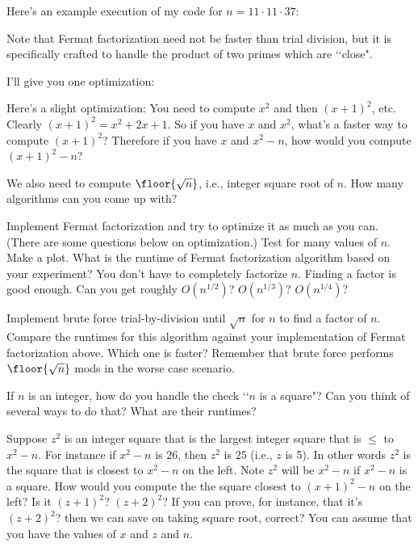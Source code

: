 Here's an example execution of my code
for $n = 11 \cdot 11 \cdot 37$:

Note that Fermat factorization need not be faster than trial division,
but it is specifically crafted to handle the product of two primes which are
\lq\lq close".

I'll give you one optimization:

\begin{ex}
Here's a slight optimization:
You need to compute $x^2$ and then $(x + 1)^2$, etc.
Clearly $(x + 1)^2 = x^2 + 2x + 1$.
So if you have $x$ and $x^2$, what's a faster way to compute $(x + 1)^2$?
Therefore if you have $x$ and $x^2 - n$, how would you compute
$(x+1)^2 - n$?
\end{ex}

\begin{ex}
  We also need to compute $\floor{\sqrt{n}}$, i.e., integer square root
  of $n$.
  How many algorithms can you come up with?
\end{ex}

\begin{ex}
  Implement Fermat factorization and try to optimize it as much as you can.
  (There are some questions below on optimization.)
  Test for many values of $n$.
  Make a plot.
  What is the runtime of Fermat factorization algorithm based on your experiment?
  You don't have to completely factorize $n$.
  Finding a factor is good enough.
  Can you get roughly $O(n^{1/2})$? $O(n^{1/3})$? $O(n^{1/4})$?
\end{ex}

\begin{ex}
  Implement brute force trial-by-division until $\sqrt{n}$ for $n$
  to find a factor of $n$.
  Compare the runtimes for this algorithm
  against your implementation of Fermat factorization above.
  Which one is faster?
  Remember that brute force performs $\floor{\sqrt{n}}$ mods in the worse case scenario.
\end{ex}

\begin{ex}
  If $n$ is an integer, how do you handle the check \lq\lq $n$ is a square"?
  Can you think of several ways to do that?
  What are their runtimes?
\end{ex}


\begin{ex}
  Suppose $z^2$ is an integer square that is the largest integer square that is $\leq$ to $x^2 - n$.
  For instance if $x^2 - n$ is $26$, then $z^2$ is $25$ (i.e., $z$ is 5).
  In other words $z^2$ is the square that is closest to $x^2 - n$ on the left.
  Note $z^2$ will be $x^2 - n$ if $x^2 - n$ is a square.
  How would you compute the the square closest to $(x + 1)^2 - n$ on the left?
  Is it $(z + 1)^2$? $(z + 2)^2$?
  If you can prove, for instance, that it's $(z + 2)^2$? then we can save
  on taking square root, correct?
  You can assume that you have the values of $x$ and $z$ and $n$.
\end{ex}

